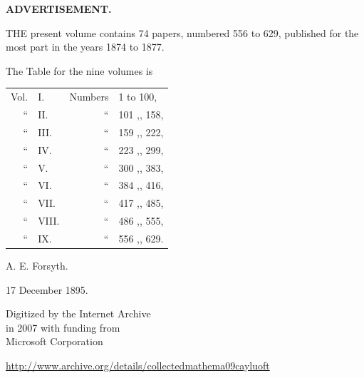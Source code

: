 \documentclass[12pt,a4paper]{article}
\theoremstyle{plain}
\theoremstyle{definition}
\begin{document}

\newpage
\thispagestyle{empty}

\begin{center}
{\large \textbf{ADVERTISEMENT.}}
\end{center}

\vspace{12pt}

\noindent THE present volume contains 74 papers, numbered 556 to 629, published for the most part in the years 1874 to 1877.

\vspace{12pt}

\noindent The Table for the nine volumes is

\begin{center}
\begin{tabular}{r @{~} l @{~} r @{~} l}
Vol. & I. & Numbers & 1 to 100,\\ 
`` & II. & `` & 101 ,, 158,\\ 
`` & III. & `` & 159 ,, 222,\\ 
`` & IV. & `` & 223 ,, 299,\\ 
`` & V. & `` & 300 ,, 383,\\ 
`` & VI. & `` & 384 ,, 416,\\ 
`` & VII. & `` & 417 ,, 485,\\ 
`` & VIII. & `` & 486 ,, 555,\\ 
`` & IX. & `` & 556 ,, 629.\\ 
\end{tabular}
\end{center}

\vspace{12pt}

\hfill A. E. Forsyth.

\hfill 17 December 1895.


\newpage
\thispagestyle{empty}

\begin{center}
{\small Digitized by the Internet Archive\\
in 2007 with funding from\\
Microsoft Corporation}

\vspace{12pt}
\url{http://www.archive.org/details/collectedmathema09cayluoft}
\end{center}
\end{document}

